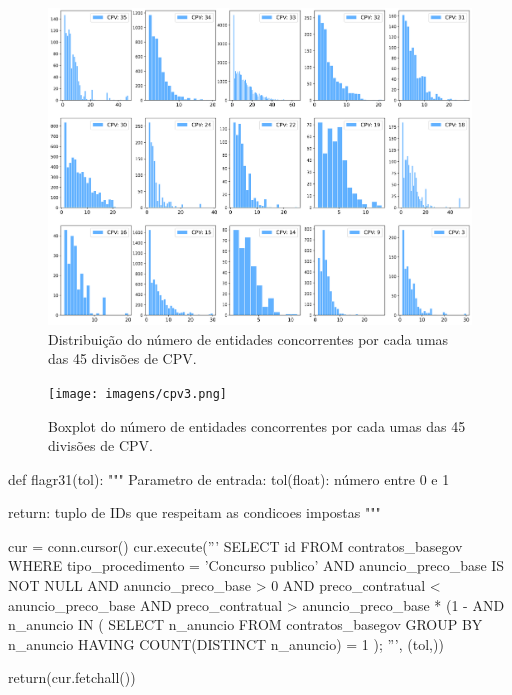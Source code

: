 \begin{figure}[H]
	\centering
	\includegraphics[width=\textwidth]{imagens/r019_hist3.png}
	\caption{Distribuição do número de entidades concorrentes por cada umas das 45 divisões de CPV.}
	\label{fig:distisnec}
\end{figure}

\begin{figure}[H]
	\centering
	\texttt{[image: imagens/cpv3.png]}
	\caption{Boxplot do número de entidades concorrentes por cada umas das 45 divisões de CPV.}
	\label{fig:boxplotsnec}
\end{figure}


\begin{code}[caption={Código em Python referente à flag R031.},captionpos=b,label=lst:r31,
	language=python,
	showspaces=false,
	showstringspaces=false,
	basicstyle=\ttfamily,
	numbers=left,
	numberstyle=\tiny,
	commentstyle=\color{gray}, 
	frame=single,
	autogobble=true,
	breaklines=true,
	postbreak=\mbox{\textcolor{red}{$\hookrightarrow$}\space},
	]
	def flagr31(tol):
		"""
		Parametro de entrada:
		tol(float): número entre 0 e 1
		
		return: tuplo de IDs que respeitam as condicoes impostas
		"""
	
		cur = conn.cursor()
		cur.execute('''
		SELECT id
		FROM contratos_basegov
		WHERE tipo_procedimento = 'Concurso publico' 
		AND anuncio_preco_base IS NOT NULL 
		AND anuncio_preco_base > 0 
		AND preco_contratual < anuncio_preco_base 
		AND preco_contratual > anuncio_preco_base * (1 - %
		AND n_anuncio IN (
		SELECT n_anuncio
		FROM contratos_basegov
		GROUP BY n_anuncio
		HAVING COUNT(DISTINCT n_anuncio) = 1
		);
		''', (tol,))
	
		return(cur.fetchall())
	
\end{code}



